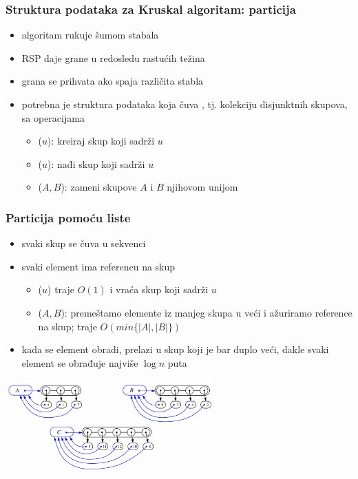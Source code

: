 \documentclass[compress,aspectratio=169]{beamer}
\begin{document}
\begin{frame}[fragile]
  \frametitle{Struktura podataka za Kruskal algoritam: particija}
  \begin{itemize}
    \item algoritam rukuje šumom stabala
    \item RSP daje grane u redosledu rastućih težina
    \item grana se prihvata ako spaja različita stabla
    \item potrebna je struktura podataka koja čuva ,
      tj. kolekciju disjunktnih skupova, sa operacijama
    \begin{itemize}
      \item {}($u$): kreiraj skup koji sadrži $u$
      \item {}($u$): nađi skup koji sadrži $u$
      \item {}($A,B$): zameni skupove $A$ i $B$ njihovom 
        unijom
    \end{itemize}
  \end{itemize}
\end{frame}

\begin{frame}[fragile]
  \frametitle{Particija pomoću liste}
  \begin{itemize}
    \item svaki skup se čuva u sekvenci
    \item svaki element ima referencu na skup
    \begin{itemize}
      \item {}($u$) traje $O(1)$ i vraća skup koji sadrži $u$
      \item {}($A,B$): premeštamo elemente iz manjeg skupa u
        veći i ažuriramo reference na skup; traje $O(min\{|A|,|B|\})$
    \end{itemize}
    \item kada se element obradi, prelazi u skup koji je bar duplo veći,
      dakle svaki element se obrađuje najviše $\log n$ puta
  \end{itemize}
  \begin{center}
    \includegraphics[width=8cm]{asp-14-pic77.png}
  \end{center}
\end{frame}
\end{document}
